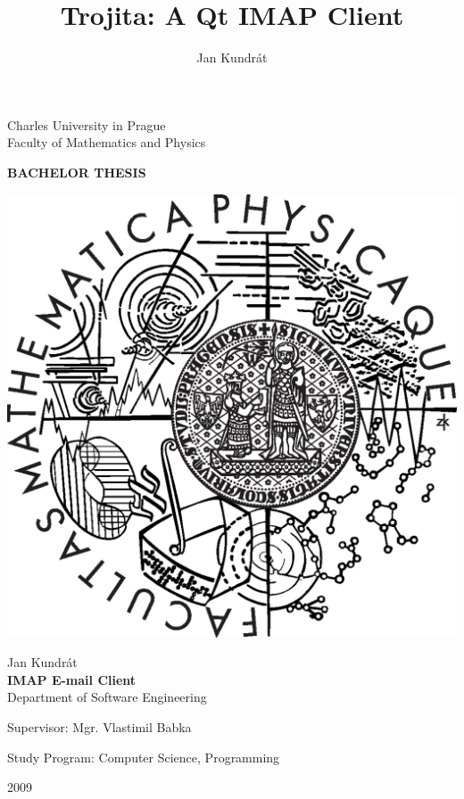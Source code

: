 \documentclass[12pt,notitlepage]{report}
\title{Trojita: A Qt IMAP Client}
\author{Jan Kundrát}
\begin{document}
\begin{titlepage}
\begin{center}

\vspace{15mm}

\large
Charles University in Prague\\
Faculty of Mathematics and Physics\\

\vspace{5mm}

{\Large\bf BACHELOR THESIS}

\vspace{10mm}

\includegraphics[scale=0.3]{logo.eps}

\vspace{25mm}

{\Large Jan Kundrát}\\
\vspace{5mm}
{\Large\bf IMAP E-mail Client}\\
\vspace{5mm}
Department of Software Engineering\\
\vspace{15mm}

\large
\noindent Supervisor: Mgr. Vlastimil Babka
\vspace{1mm} 

\noindent Study Program: Computer Science, Programming

\vspace{20mm}

2009
\end{center}

\end{titlepage}
\end{document}
